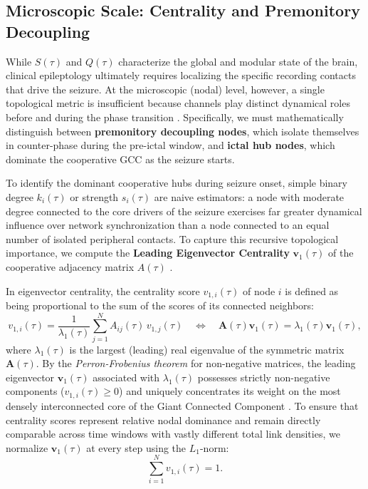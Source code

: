 \subsection{Microscopic Scale: Centrality and Premonitory Decoupling}
While $S(\tau)$ and $Q(\tau)$ characterize the global and modular state of the brain, clinical epileptology ultimately requires localizing the specific recording contacts that drive the seizure. At the microscopic (nodal) level, however, a single topological metric is insufficient because channels play distinct dynamical roles before and during the phase transition \cite{khambhati2015dynamic}. Specifically, we must mathematically distinguish between \textbf{premonitory decoupling nodes}, which isolate themselves in counter-phase during the pre-ictal window, and \textbf{ictal hub nodes}, which dominate the cooperative GCC as the seizure starts.

To identify the dominant cooperative hubs during seizure onset, simple binary degree $k_i(\tau)$ or strength $s_i(\tau)$ are naive estimators: a node with moderate degree connected to the core drivers of the seizure exercises far greater dynamical influence over network synchronization than a node connected to an equal number of isolated peripheral contacts. To capture this recursive topological importance, we compute the \textbf{Leading Eigenvector Centrality} $\mathbf{v}_1(\tau)$ of the cooperative adjacency matrix $A(\tau)$ \cite{newman2018networks, khambhati2015dynamic}.

In eigenvector centrality, the centrality score $v_{1,i}(\tau)$ of node $i$ is defined as being proportional to the sum of the scores of its connected neighbors:
\begin{equation}
    v_{1,i}(\tau) = \frac{1}{\lambda_1(\tau)} \sum_{j=1}^{N} A_{ij}(\tau) \, v_{1,j}(\tau) \quad \Longleftrightarrow \quad \mathbf{A}(\tau) \mathbf{v}_1(\tau) = \lambda_1(\tau) \mathbf{v}_1(\tau),
    \label{eq:eigenvector_centrality}
\end{equation}
where $\lambda_1(\tau)$ is the largest (leading) real eigenvalue of the symmetric matrix $\mathbf{A}(\tau)$. By the \textit{Perron-Frobenius theorem} for non-negative matrices, the leading eigenvector $\mathbf{v}_1(\tau)$ associated with $\lambda_1(\tau)$ possesses strictly non-negative components ($v_{1,i}(\tau) \geq 0$) and uniquely concentrates its weight on the most densely interconnected core of the Giant Connected Component \cite{newman2018networks}. To ensure that centrality scores represent relative nodal dominance and remain directly comparable across time windows with vastly different total link densities, we normalize $\mathbf{v}_1(\tau)$ at every step using the $L_1$-norm:
\begin{equation}
    \sum_{i=1}^{N} v_{1,i}(\tau) = 1.
    \label{eq:l1_norm}
\end{equation}

